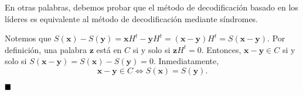 En otras palabras, debemos probar que el método de decodificación basado en los líderes es equivalente al método de decodificación mediante síndromes.

Notemos que $S(\textbf{x}) - S(\textbf{y}) = \textbf{x}H^t - \textbf{y}H^t = (\textbf{x} - \textbf{y})H^t = S(\textbf{x}-\textbf{y})$. Por definición, una palabra $\textbf{z}$ está en $C$ si y solo si $\textbf{z}H^t = 0$. Entonces, $\textbf{x} - \textbf{y} \in C$ si y solo si $S(\textbf{x}-\textbf{y}) = S(\textbf{x}) - S(\textbf{y}) = 0$. Inmediatamente, \[\textbf{x}-\textbf{y} \in C \iff S(\textbf{x}) = S(\textbf{y}).\]

$\qed$
